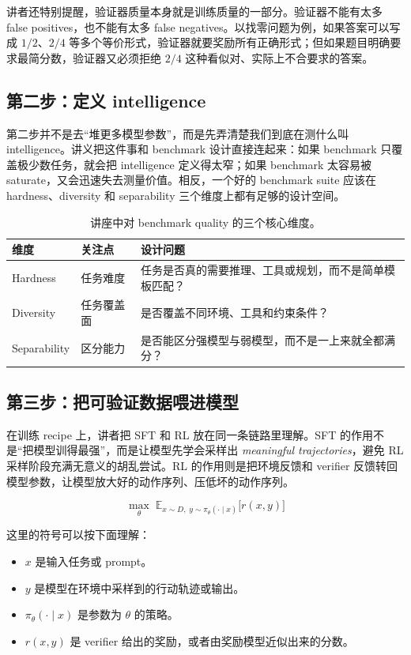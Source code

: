 \documentclass[a4paper]{article}
\begin{document}
讲者还特别提醒，验证器质量本身就是训练质量的一部分。验证器不能有太多 false positives，也不能有太多 false negatives。以找零问题为例，如果答案可以写成 $1/2$、$2/4$ 等多个等价形式，验证器就要奖励所有正确形式；但如果题目明确要求最简分数，验证器又必须拒绝 $2/4$ 这种看似对、实际上不合要求的答案。

\subsection{第二步：定义 intelligence}
第二步并不是去“堆更多模型参数”，而是先弄清楚我们到底在测什么叫 intelligence。讲义把这件事和 benchmark 设计直接连起来：如果 benchmark 只覆盖极少数任务，就会把 intelligence 定义得太窄；如果 benchmark 太容易被 saturate，又会迅速失去测量价值。相反，一个好的 benchmark suite 应该在 hardness、diversity 和 separability 三个维度上都有足够的设计空间。

\begin{table}[H]
\centering
\small
\begin{tabular}{@{}p{}p{}p{}@{}}
\toprule
维度 & 关注点 & 设计问题 \\
\midrule
Hardness & 任务难度 & 任务是否真的需要推理、工具或规划，而不是简单模板匹配？ \\
Diversity & 任务覆盖面 & 是否覆盖不同环境、工具和约束条件？ \\
Separability & 区分能力 & 是否能区分强模型与弱模型，而不是一上来就全都满分？ \\
\bottomrule
\end{tabular}
\caption{讲座中对 benchmark quality 的三个核心维度。}
\end{table}

\subsection{第三步：把可验证数据喂进模型}
在训练 recipe 上，讲者把 SFT 和 RL 放在同一条链路里理解。SFT 的作用不是“把模型训得最强”，而是让模型先学会采样出 \emph{meaningful trajectories}，避免 RL 采样阶段充满无意义的胡乱尝试。RL 的作用则是把环境反馈和 verifier 反馈转回模型参数，让模型放大好的动作序列、压低坏的动作序列。

\[
\max_{\theta}\; \mathbb{E}_{x \sim D,\; y \sim \pi_{\theta}(\cdot \mid x)}\big[r(x,y)\big]
\]

这里的符号可以按下面理解：
\begin{itemize}
  \item $x$ 是输入任务或 prompt。
  \item $y$ 是模型在环境中采样到的行动轨迹或输出。
  \item $\pi_{\theta}(\cdot \mid x)$ 是参数为 $\theta$ 的策略。
  \item $r(x,y)$ 是 verifier 给出的奖励，或者由奖励模型近似出来的分数。
\end{itemize}
\end{document}
